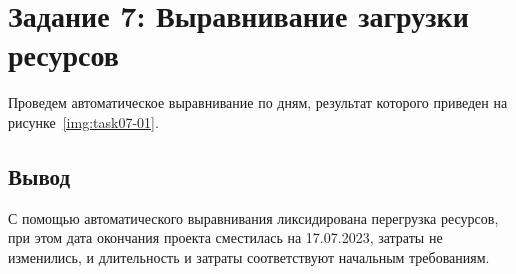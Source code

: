 \section{Задание 7: Выравнивание загрузки ресурсов}

Проведем автоматическое выравнивание по дням, результат которого приведен на
рисунке~\ref{img:task07-01}.


\subsection*{Вывод}

С помощью автоматического выравнивания ликсидирована перегрузка ресурсов, при
этом дата окончания проекта сместилась на 17.07.2023, затраты не изменились, и
длительность и затраты соответствуют начальным требованиям.
